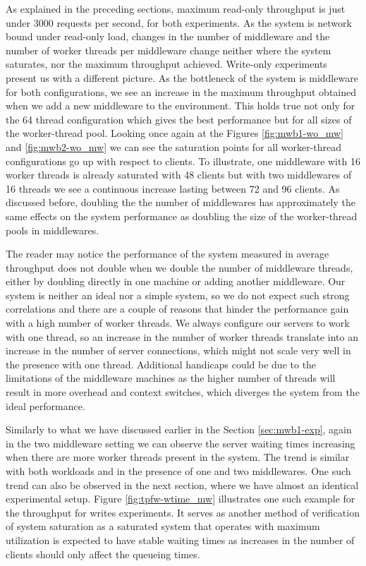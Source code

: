\documentclass[11pt,a4paper]{article}
\begin{document}
\par As explained in the preceding sections, maximum read-only throughput is just under 3000 requests per second, for both experiments. As the system is network bound under read-only load, changes in the number of middleware and the number of worker threads per middleware change neither where the system saturates, nor the maximum throughput achieved. Write-only experiments present us with a different picture. As the bottleneck of the system is middleware for both configurations, we see an increase in the maximum throughput obtained when we add a new middleware to the environment. This holds true not only for the 64 thread configuration which gives the best performance but for all sizes of the worker-thread pool. Looking once again at the Figures \ref{fig:mwb1-wo_mw} and \ref{fig:mwb2-wo_mw} we can see the saturation points for all worker-thread configurations go up with respect to clients. To illustrate, one middleware with 16 worker threads is already saturated with 48 clients but with two middlewares of 16 threads we see a continuous increase lasting between 72 and 96 clients. As discussed before, doubling the the number of middlewares has approximately the same effects on the system performance as doubling the size of the worker-thread pools in middlewares.
\\
\par The reader may notice the performance of the system measured in average throughput does not double when we double the number of middleware threads, either by doubling directly in one machine or adding another middleware. Our system is neither an ideal nor a simple system, so we do not expect such strong correlations and there are a couple of reasons that hinder the performance gain with a high number of worker threads. We always configure our servers to work with one thread, so an increase in the number of worker threads translate into an increase in the number of server connections, which might not scale very well in the presence with one thread. Additional handicaps could be due to the limitations of the middleware machines as the higher number of threads will result in more overhead and context switches, which diverges the system from the ideal performance.
\par Similarly to what we have discussed earlier in the Section \ref{sec:mwb1-exp}, again in the two middleware setting we can observe the server waiting times increasing when there are more worker threads present in the system. The trend is similar with both workloads and in the presence of one and two middlewares. One such trend can also be observed in the next section, where we have almost an identical experimental setup. Figure \ref{fig:tpfw-wtime_mw} illustrates one such example for the throughput for writes experiments. It serves as another method of verification of system saturation as a saturated system that operates with maximum utilization is expected to have stable waiting times as increases in the number of clients should only affect the queueing times.
\end{document}
